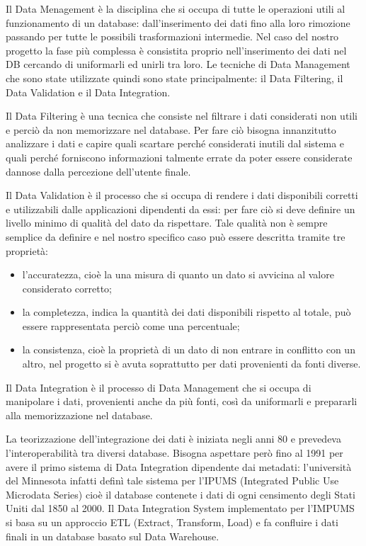 \documentclass[12pt]{report}
\begin{document}
Il Data Menagement è la disciplina che si occupa di tutte le operazioni utili al funzionamento di un database: dall'inserimento dei dati fino alla loro rimozione passando per tutte le possibili trasformazioni intermedie.
Nel caso del nostro progetto la fase più complessa è consistita proprio nell'inserimento dei dati nel DB cercando di uniformarli ed unirli tra loro. 
Le tecniche di Data Management che sono state utilizzate quindi sono state principalmente: il Data Filtering, il Data Validation e il Data Integration.

\vspace{5mm} %

Il Data Filtering è una tecnica che consiste nel filtrare i dati considerati non utili e perciò da non memorizzare nel database.
Per fare ciò bisogna innanzitutto analizzare i dati e capire quali scartare perché considerati inutili dal sistema e quali perché forniscono informazioni talmente errate da poter essere considerate dannose dalla percezione dell'utente finale.

\vspace{5mm} %

Il Data Validation è il processo che si occupa di rendere i dati disponibili corretti e utilizzabili dalle applicazioni dipendenti da essi: per fare ciò si deve definire un livello minimo di qualità del dato da rispettare. 
Tale qualità non è sempre semplice da definire e nel nostro specifico caso può essere descritta tramite tre proprietà:
\begin{itemize}
\item l'accuratezza, cioè la una misura di quanto un dato si avvicina al valore considerato corretto;
\item la completezza, indica la quantità dei dati disponibili rispetto al totale, può essere rappresentata perciò come una percentuale;
\item la consistenza, cioè la proprietà di un dato di non entrare in conflitto con un altro, nel progetto si è avuta soprattutto per dati provenienti da fonti diverse.
\end{itemize}

\vspace{5mm} %

Il Data Integration è il processo di Data Management che si occupa di manipolare i dati, provenienti anche da più fonti, così da uniformarli e prepararli alla memorizzazione nel database.

La teorizzazione dell'integrazione dei dati è iniziata negli anni 80 e prevedeva l'interoperabilità tra diversi database\cite{Multibase}.
Bisogna aspettare però fino al 1991 per avere il primo sistema di Data Integration dipendente dai metadati: l'università del Minnesota infatti definì tale sistema per l'IPUMS (Integrated Public Use Microdata Series) cioè il database contenete i dati di ogni censimento degli Stati Uniti dal 1850 al 2000. 
Il Data Integration System implementato per l'IMPUMS si basa su un approccio ETL (Extract, Transform, Load) e fa confluire i dati finali in un database basato sul Data Warehouse.
\end{document}
